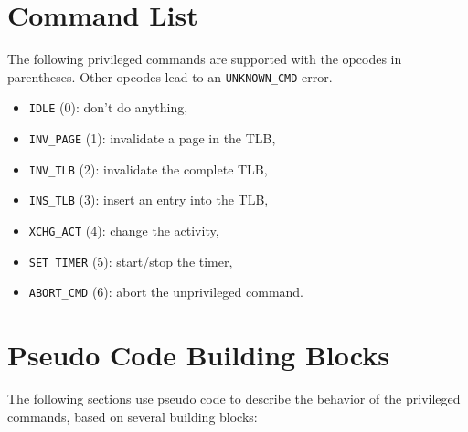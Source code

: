 \section{Command List}

The following privileged commands are supported with the opcodes in parentheses. Other opcodes lead
to an \texttt{UNKNOWN\_CMD} error.

\begin{itemize}
  \item \texttt{IDLE} (0):  don't do anything, \extend{}
  \item \texttt{INV\_PAGE} (1): invalidate a page in the TLB, 
  \item \texttt{INV\_TLB} (2): invalidate the complete TLB,
  \item \texttt{INS\_TLB} (3): insert an entry into the TLB, \extend{}
  \item \texttt{XCHG\_ACT} (4): change the activity, 
  \item \texttt{SET\_TIMER} (5): start/stop the timer,
  \item \texttt{ABORT\_CMD} (6): abort the unprivileged command. \extend{}
\end{itemize}

\section{Pseudo Code Building Blocks}

The following sections use pseudo code to describe the behavior of the privileged commands, based on
several building blocks:


